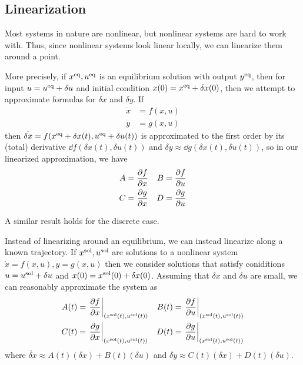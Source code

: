 \subsection{Linearization}

Most systems in nature are nonlinear, but nonlinear systems are hard to work with. Thus, since nonlinear systems look linear locally, we can linearize them around a point. 

More precisely, if $x^\mathrm{eq}, u^\mathrm{eq}$ is an equilibrium solution with output $y^\mathrm{eq}$, then for input $u = u^\mathrm{eq} + \delta u$ and initial condition $x(0) = x^\mathrm{eq} + \delta x(0)$, then we attempt to approximate formulas for $\delta x$ and $\delta y$. If \begin{align*}
    \dot x &= f(x, u)\\
    y &= g(x, u)
\end{align*}
then $\dot {\delta x} = f(x^\mathrm{eq} + \delta x(t), u^\mathrm{eq} + \delta u(t))$ is approximated to the first order by its (total) derivative $\dd{f}(\delta x(t), \delta u(t))$ and $\delta y \approx \dd{g}(\delta x(t), \delta u(t))$, so in our linearized approximation, we have \begin{align*}
    A &= \pdv{f}{x} &B &= \pdv{f}{u}\\
    C &= \pdv{g}{x} &D &= \pdv{g}{u} 
\end{align*}

A similar result holds for the discrete case.

Instead of linearizing around an equilibrium, we can instead linearize along a known trajectory. If $x^\mathrm{sol}, u^\mathrm{sol}$ are solutions to a nonlinear system $\dot x = f(x, u), y = g(x, u)$ then we consider solutions that satisfy coniditions $u = u^\mathrm{sol} + \delta u$ and $x(0) = x^\mathrm{sol}(0) + \delta x(0)$. Assuming that $\delta x$ and $\delta u$ are small, we can reasonably approximate the system as \begin{align*}
    A(t) &= \eval{\pdv{f}{x}}_{\qty(x^\mrm{sol}(t), u^\mrm{sol}(t))} &B(t) &= \eval{\pdv{f}{u}}_{\qty(x^\mrm{sol}(t), u^\mrm{sol}(t))}\\
    C(t) &= \eval{\pdv{g}{x}}_{\qty(x^\mrm{sol}(t), u^\mrm{sol}(t))} &D(t) &= \eval{\pdv{g}{u}}_{\qty(x^\mrm{sol}(t), u^\mrm{sol}(t))} 
\end{align*}
where $\dot{\delta x} \approx A(t)(\delta x) + B(t)(\delta u)$ and $\delta y \approx C(t)(\delta x) + D(t)(\delta u)$.
